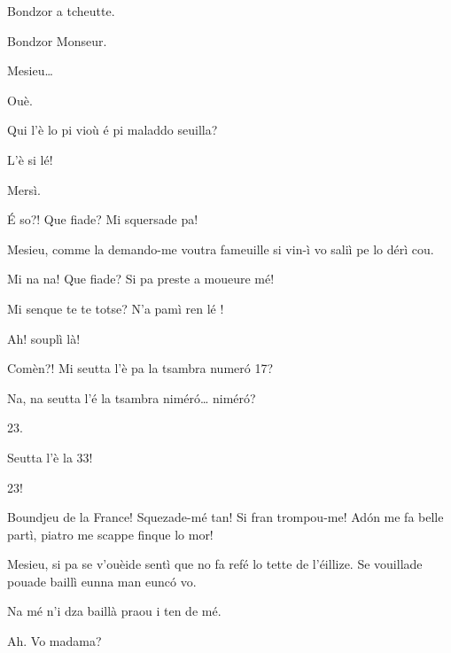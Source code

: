 \begin{drama}
\Priespeaks{} Bondzor a tcheutte.

\Casimirspeaks Bondzor Monseur.


\Priespeaks Mesieu\ldots

\Eunfeurmispeaks Ouè.

\Priespeaks Qui l'è lo pi vioù é pi maladdo seuilla?

\Eunfeurmispeaks {}
L'è si lé!

\Priespeaks Mersì.


\Casimirspeaks{} \'E so?! Que fiade? Mi squersade pa!

\Priespeaks {} Mesieu, com\-me la demando-me voutra fameuille si vin-ì vo saliì pe lo dérì cou.

\Casimirspeaks {} Mi na na! Que fiade? Si pa preste a moueure mé!

\Gerominespeaks Mi senque te te totse? N'a pamì ren lé \riye !

\Casimirspeaks Ah! souplì là!

\Priespeaks {} Comèn?! Mi seutta l’è pa la tsambra numer\'o 17?

\Casimirspeaks Na, na seutta l’é la tsambra nimér\'o\ldots {} nimér\'o?

\Gerominespeaks {} 23.

\Casimirspeaks Seutta l’è la 33!

\Gerominespeaks {} 23!

\Priespeaks Boundjeu de la France! Squezade-mé tan! Si fran trom\-pou-me! Ad\'on me fa belle partì, piatro me scappe finque lo mor!


\Priespeaks Mesieu, si pa se v'ouèide sentì que no fa refé lo tette de l’éillize. Se vouillade pouade baillì eunna man eunc\'o vo.

\Casimirspeaks Na mé n'i dza baillà praou i  ten de mé.

\Priespeaks{} Ah.  Vo madama?


\end{drama}
